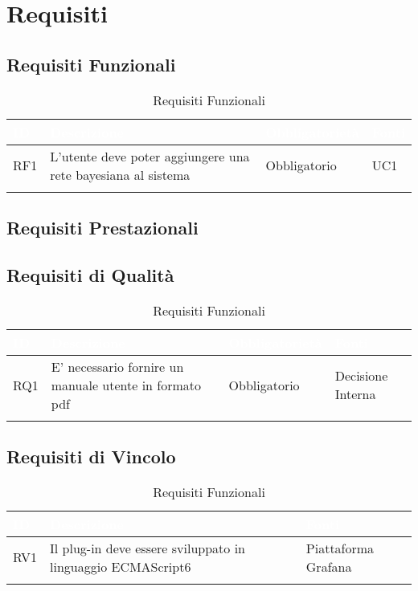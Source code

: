 \section{Requisiti}\label{Requisiti}

\subsection{Requisiti Funzionali}\label{RF}
\begin{center}
\begin{longtable}[c]{|m{}|m{}|m{}|m{}|}
\hline
\rowcolor{bluelogo}\textbf{\textcolor{white}{ID}} & \textbf{\textcolor{white}{Descrizione}} & \textbf{\textcolor{white}{Obbligatorietà}} & \textbf{\textcolor{white}{Fonti}}\\
\hline \hline
\endfirsthead
RF1 & L'utente deve poter aggiungere una rete bayesiana al sistema & Obbligatorio & UC1\\
\hline
\caption{Requisiti Funzionali}
\end{longtable}
\end{center}

\subsection{Requisiti Prestazionali}\label{RP}

\subsection{Requisiti di Qualità}\label{RQ}
\begin{center}
\begin{longtable}[c]{|m{}|m{}|m{}|m{}|}
\hline
\rowcolor{bluelogo}\textbf{\textcolor{white}{ID}} & \textbf{\textcolor{white}{Descrizione}} & \textbf{\textcolor{white}{Obbligatorietà}} & \textbf{\textcolor{white}{Fonti}}\\
\hline \hline
\endfirsthead
RQ1 & E' necessario fornire un manuale utente in formato pdf & Obbligatorio & Decisione Interna\\
\hline
\caption{Requisiti Funzionali}
\end{longtable}
\end{center}

\subsection{Requisiti di Vincolo}\label{RV}
\begin{center}
\begin{longtable}[c]{|m{}|m{}|m{}|}
\hline
\rowcolor{bluelogo}\textbf{\textcolor{white}{ID}} & \textbf{\textcolor{white}{Descrizione}} & \textbf{\textcolor{white}{Fonti}}\\
\hline \hline
\endfirsthead
RV1 & Il plug-in deve essere sviluppato in linguaggio ECMAScript6 & Piattaforma Grafana\\
\hline
\caption{Requisiti Funzionali}
\end{longtable}
\end{center}